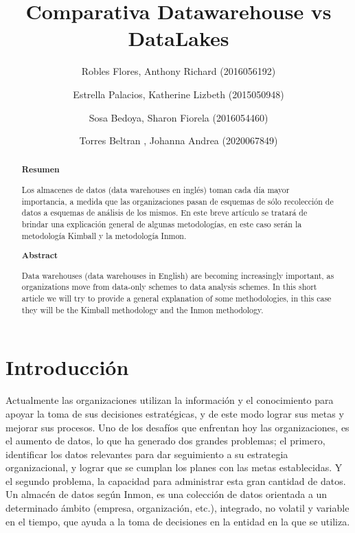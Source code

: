 \documentclass[%
 reprint,
 amsmath,amssymb,
 aps,
]{revtex4-1}
\begin{document}
\title{Comparativa Datawarehouse vs DataLakes}
\author{Robles Flores, Anthony Richard	               (2016056192)}
\author{Estrella Palacios, Katherine Lizbeth			(2015050948)}
\author{Sosa Bedoya, Sharon Fiorela					(2016054460)}
\author{Torres Beltran , Johanna Andrea				(2020067849)}

		
%

\begin{abstract}
\begin{center}
\textbf{Resumen}
\end{center}
Los almacenes de datos (data warehouses en inglés) toman cada día mayor importancia, a medida que las organizaciones pasan de esquemas de sólo recolección de datos a esquemas de análisis de los mismos. En este breve artículo se  tratará de brindar una explicación general de algunas metodologías, en este caso serán la metodología Kimball y la metodología Inmon.
\\

\begin{center}
\textbf{Abstract}
\end{center}
Data warehouses (data warehouses in English) are becoming increasingly important, as organizations move from data-only schemes to data analysis schemes. In this short article we will try to provide a general explanation of some methodologies, in this case they will be the Kimball methodology and the Inmon methodology.
\\
\end{abstract}



\maketitle


\section {Introducción}\label{sec:1}

Actualmente las organizaciones utilizan la información y el conocimiento para apoyar la toma de sus decisiones estratégicas, y de este modo lograr sus metas y mejorar sus procesos.
Uno de los desafíos que enfrentan hoy las organizaciones, es el aumento de datos, lo que ha generado dos grandes problemas; el primero, identificar los datos relevantes para dar seguimiento a su estrategia organizacional, y lograr que se cumplan los planes con las metas establecidas.
 Y el segundo problema, la capacidad para administrar esta gran cantidad de datos.
Un almacén de datos  según Inmon, es una colección de datos orientada a un determinado ámbito (empresa, organización, etc.), integrado, no volatil y variable en el tiempo, que ayuda a la toma de decisiones en la entidad en la que se utiliza. 
 \cite{estrella1}
\end{document}
